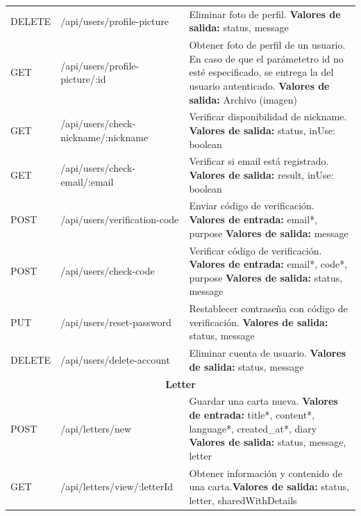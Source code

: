 \begin{longtable}{|l|p{5cm}|p{8cm}|}
DELETE & /api/users/profile-picture & Eliminar foto de perfil. \newline \textbf{Valores de salida:} status, message \\
GET & /api/users/profile-picture/:id & Obtener foto de perfil de un usuario. En caso de que el parámetetro id no esté especificado, se entrega la del usuario autenticado. \newline \textbf{Valores de salida:} Archivo (imagen) \\
GET & /api/users/check-nickname/:nickname & Verificar disponibilidad de nickname. \newline \textbf{Valores de salida:} status, inUse: boolean \\
GET & /api/users/check-email/:email & Verificar si email está registrado. \newline \textbf{Valores de salida:} result, inUse: boolean \\
POST & /api/users/verification-code & Enviar código de verificación. \newline \textbf{Valores de entrada:} email*, purpose \newline \textbf{Valores de salida:} message \\
POST & /api/users/check-code & Verificar código de verificación. \newline \textbf{Valores de entrada:} email*, code*, purpose \newline \textbf{Valores de salida:} status, message \\
PUT & /api/users/reset-password & Restablecer contraseña con código de verificación. \newline \textbf{Valores de salida:} status, message \\
DELETE & /api/users/delete-account & Eliminar cuenta de usuario. \newline \textbf{Valores de salida:} status, message \\
\hline
\hline
\multicolumn{3}{|c|}{\textbf{Letter}} \\
\hline
POST & /api/letters/new & Guardar una carta nueva. \newline \textbf{Valores de entrada:} title*, content*, language*, created\_at*, diary \newline \textbf{Valores de salida:} status, message, letter \\
GET & /api/letters/view/:letterId & Obtener información y contenido de una carta.\newline \textbf{Valores de salida:} status, letter, sharedWithDetails \\

\end{longtable}
